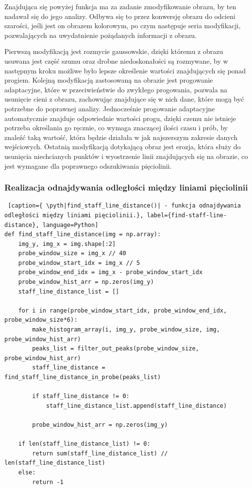 Znajdująca się powyżej funkcja ma za zadanie zmodyfikowanie obrazu, by ten nadawał się do jego analizy. Odbywa się to przez konwersję obrazu do odcieni szarości, jeśli jest on obrazem kolorowym, po czym następuje seria modyfikacji, pozwalających na uwydatnienie pożądanych informacji z obrazu.

Pierwszą modyfikacją jest rozmycie gaussowskie, dzięki któremu z obrazu usuwana jest część szumu oraz drobne niedoskonałości są rozmywane, by w następnym kroku możliwe było lepsze określenie wartości znajdujących się ponad progiem. Kolejną modyfikacją zastosowaną na obrazie jest progowanie adaptacyjne, które w przeciwieństwie do zwykłego progowania, pozwala na usunięcie cieni z obrazu, zachowując znajdujące się w nich dane, które mogą być potrzebne do poprawnej analizy. Jednocześnie progowanie adaptacyjne automatycznie znajduje odpowiednie wartości progu, dzięki czemu nie istnieje potrzeba określania go ręcznie, co wymaga znaczącej ilości czasu i prób, by znaleźć taką wartość, która będzie działała w jak najszerszym zakresie danych wejściowych. Ostatnią modyfikacją dotykającą obraz jest erozja, która służy do usunięcia niechcianych punktów i wyostrzenie linii znajdujących się na obrazie, co jest wymagane dla poprawnego odszukiwania pięciolinii.



\subsubsection{Realizacja odnajdywania odległości między liniami pięciolinii} \label{find_staff_line_distance_impl}

\begin{lstlisting} [caption={ \pyth|find_staff_line_distance()| - funkcja odnajdywania odległości między liniami pięciolinii.}, label={find-staff-line-distance}, language=Python]
def find_staff_line_distance(img = np.array):
	img_y, img_x = img.shape[:2]
	probe_window_size = img_x // 40
	probe_window_start_idx = img_x // 5
	probe_window_end_idx = img_x - probe_window_start_idx
	probe_window_hist_arr = np.zeros(img_y)
	staff_line_distance_list = []
	
	for i in range(probe_window_start_idx, probe_window_end_idx, probe_window_size*6):
		make_histogram_array(i, img_y, probe_window_size, img, probe_window_hist_arr)
		peaks_list = filter_out_peaks(probe_window_size, probe_window_hist_arr)
		staff_line_distance = find_staff_line_distance_in_probe(peaks_list)
		
		if staff_line_distance != 0:
			staff_line_distance_list.append(staff_line_distance)
		
		probe_window_hist_arr = np.zeros(img_y)
	
	if len(staff_line_distance_list) != 0:
		return sum(staff_line_distance_list) // len(staff_line_distance_list)
	else:
		return -1
\end{lstlisting}

